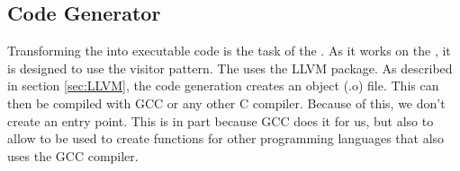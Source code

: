 \subsection{Code Generator}
\label{sec:codeGeneratorDesign} 

Transforming the \ast{} into executable code is the task of the \codeGen. As it works
on the \ast{}, it is designed to use the visitor pattern. The \codeGen{} uses the
LLVM package\cite{LLVM}. As described in section \ref{sec:LLVM}, the code generation
creates an object (.o) file. This can then be compiled with GCC or any other C
compiler. Because of this, we don't create an entry point. This is in part because
GCC does it for us, but also to allow \lang{} to be used to create functions for
other programming languages that also uses the GCC compiler. 

